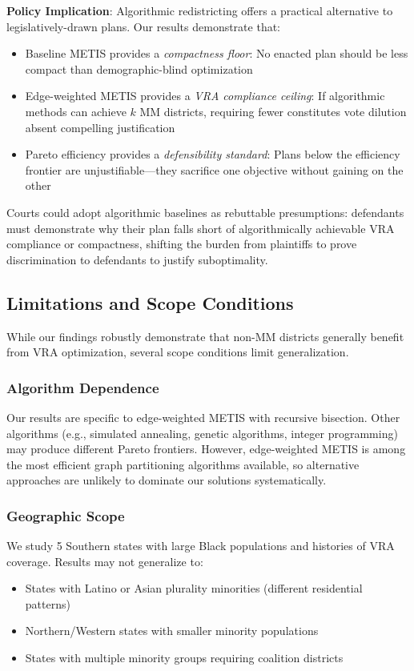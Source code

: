 \textbf{Policy Implication}: Algorithmic redistricting offers a practical alternative to legislatively-drawn plans. Our results demonstrate that:
\begin{itemize}
    \item Baseline METIS provides a \emph{compactness floor}: No enacted plan should be less compact than demographic-blind optimization
    \item Edge-weighted METIS provides a \emph{VRA compliance ceiling}: If algorithmic methods can achieve $k$ MM districts, requiring fewer constitutes vote dilution absent compelling justification
    \item Pareto efficiency provides a \emph{defensibility standard}: Plans below the efficiency frontier are unjustifiable---they sacrifice one objective without gaining on the other
\end{itemize}

Courts could adopt algorithmic baselines as rebuttable presumptions: defendants must demonstrate why their plan falls short of algorithmically achievable VRA compliance or compactness, shifting the burden from plaintiffs to prove discrimination to defendants to justify suboptimality.

\subsection{Limitations and Scope Conditions}

While our findings robustly demonstrate that non-MM districts generally benefit from VRA optimization, several scope conditions limit generalization.

\subsubsection{Algorithm Dependence}

Our results are specific to edge-weighted METIS with recursive bisection. Other algorithms (e.g., simulated annealing, genetic algorithms, integer programming) may produce different Pareto frontiers. However, edge-weighted METIS is among the most efficient graph partitioning algorithms available, so alternative approaches are unlikely to dominate our solutions systematically.

\subsubsection{Geographic Scope}

We study 5 Southern states with large Black populations and histories of VRA coverage. Results may not generalize to:
\begin{itemize}
    \item States with Latino or Asian plurality minorities (different residential patterns)
    \item Northern/Western states with smaller minority populations
    \item States with multiple minority groups requiring coalition districts
\end{itemize}

